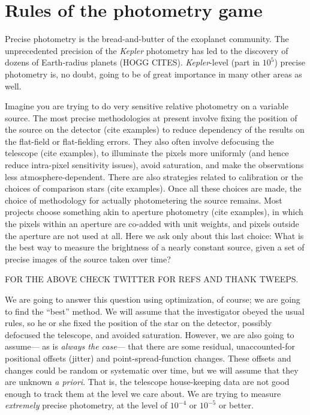 \documentclass[12pt, letterpaper, preprint]{aastex}
\newcommand{\project}[1]{\textsl{#1}}
\newcommand{\foreign}[1]{\textsl{#1}}
\begin{document}
\section{Rules of the photometry game}

Precise photometry is the bread-and-butter of the exoplanet community.
The unprecedented precision of the \project{Kepler} photometry has led to the discovery of
dozens of Earth-radius planets (HOGG CITES).
\project{Kepler}-level (part in $10^5$) precise photometry is, no doubt,
  going to be of great importance in many other areas as well.

Imagine you are trying to do very sensitive relative photometry on a variable source.
The most precise methodologies at present involve fixing the position of the source on the detector
  (cite examples)
  to reduce dependency of the results on the flat-field or flat-fielding errors.
They also often involve defocusing the telescope
  (cite examples),
  to illuminate the pixels more uniformly
  (and hence reduce intra-pixel sensitivity issues),
  avoid saturation,
  and make the observations less atmosphere-dependent.
There are also strategies related to calibration or the choices of comparison stars
  (cite examples).
Once all these choices are made,
  the choice of methodology for actually photometering the source remains.
Most projects choose something akin to aperture photometry
  (cite examples),
  in which the pixels within an aperture are co-added with unit weights,
  and pixels outside the aperture are not used at all.
Here we ask only about this last choice:
What is the best way to measure the brightness of a nearly constant source,
  given a set of precise images of the source taken over time?

FOR THE ABOVE CHECK TWITTER FOR REFS AND THANK TWEEPS.

We are going to answer this question using optimization, of course;
  we are going to find the ``best'' method.
We will assume that the investigator obeyed the usual rules,
  so he or she fixed the position of the star on the detector,
  possibly defocused the telescope,
  and avoided saturation.
However, we are also going to assume---%
  as is \emph{always the case}---%
  that there are some residual,
  unaccounted-for positional offsets (jitter) and point-spread-function changes.
These offsets and changes could be random or systematic over time,
  but we will assume that they are unknown \foreign{a priori}.
That is, the telescope house-keeping data are not good enough to track them at the level we care about.
We are trying to measure \emph{extremely} precise photometry,
  at the level of $10^{-4}$ or $10^{-5}$ or better.
\end{document}
